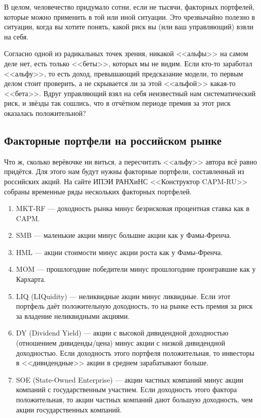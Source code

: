 В целом, человечество придумало сотни, если не тысячи, факторных портфелей, которые можно применить в той или иной ситуации. Это чрезвычайно полезно в ситуации, когда вы хотите понять, какой риск вы (или ваш управляющий) взяли на себя.

Согласно одной из радикальных точек зрения, никакой <<альфы>> на самом деле нет, есть только <<беты>>, которых мы не видим. Если кто-то заработал <<альфу>>, то есть доход, превышающий предсказание модели, то первым делом стоит проверить, а не скрывается ли за этой <<альфой>> какая-то <<бета>>. Вдруг управляющий взял на себя неизвестный нам систематический риск, и звёзды так сошлись, что в отчётном периоде премия за этот риск оказалась положительной?

\subsection{Факторные портфели на российском рынке}

Что ж, сколько верёвочке ни виться, а пересчитать <<альфу>> автора всё равно придётся. Для этого нам будут нужны факторные портфели, составленный из российских акций. На сайте ИПЭИ РАНХиНС <<Конструктор CAPM-RU>> \cite{capmruWeb} собраны временные ряды нескольких факторных портфелей.

\begin{enumerate}
\item MKT-RF --- доходность рынка минус безрисковая процентная ставка как в CAPM.
\item SMB --- маленькие акции минус большие акции как у Фамы-Френча.
\item HML --- акции стоимости минус акции роста как у Фамы-Френча.
\item MOM --- прошлогодние победители минус прошлогодние проигравшие как у Кархарта.
\item LIQ (LIQuidity) --- неликвидные акции минус ликвидные. Если этот портфель даёт положительную доходность, то на рынке есть премия за риск за владение неликвидными акциями.
\item DY (Dividend Yield) --- акции с высокой дивидендной доходностью (отношением дивиденды/цена) минус акции с низкой дивидендной доходностью. Если доходность этого портфеля положительная, то инвесторы в <<дивидендные>> акции в среднем зарабатывают больше.
\item SOE (State-Owned Enterprise) --- акции частных компаний минус акции компаний с государственным участием. Если доходность этого фактора положительная, то акции частных компаний дают большую доходность, чем акции государственных компаний.
\end{enumerate}

